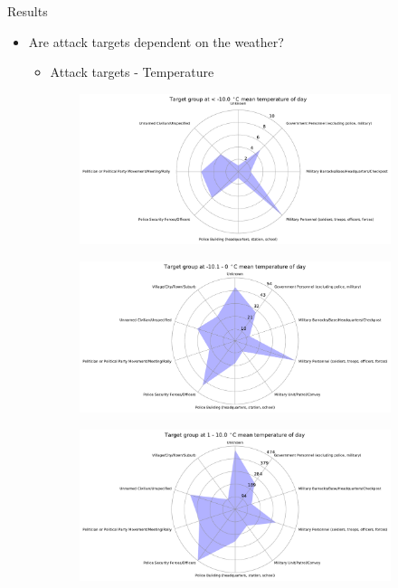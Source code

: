 \documentclass{beamer}
\begin{document}
\begin{frame}{Results}
	\begin{itemize}
		\item 
		Are attack targets dependent on the weather?
		\begin{itemize}
			\item Attack targets - Temperature
		\end{itemize}
	\end{itemize}
	
	\begin{figure}

		\begin{subfigure}[b]{0.3\textwidth}
			\includegraphics[width=\textwidth]{Temp-Target/temp<-100_starDiagram}
		\end{subfigure}
		\begin{subfigure}[b]{0.3\textwidth}
			\includegraphics[width=\textwidth]{Temp-Target/temp-101-0_starDiagram}
		\end{subfigure}
		\begin{subfigure}[b]{0.3\textwidth}
			\includegraphics[width=\textwidth]{Temp-Target/temp1-100_starDiagram}

\end{subfigure}
\end{figure}
\end{frame}
\end{document}
